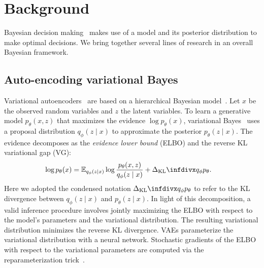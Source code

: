 \section{Background}
\label{sec:related}
Bayesian decision making~\cite{Fienberg} makes use of a model and its posterior distribution to make optimal decisions. We bring together several lines of research in an overall Bayesian framework.


\subsection{Auto-encoding variational Bayes}
\label{aevb}
Variational autoencoders~\cite{AEVB} are based on a hierarchical Bayesian model~\cite{GelmanHill:2007}. Let $x$ be the observed random variables and $z$ the latent variables. To learn a generative model $p_\theta(x, z)$ that maximizes the evidence $\log p_\theta(x)$, variational Bayes~\cite{wainwright2008graphical} uses a proposal distribution $q_\phi(z \mid x)$ to approximate the posterior $p_\theta(z \mid x)$. The evidence decomposes as the \emph{evidence lower bound} (ELBO) and the reverse KL variational gap (VG):
\begin{align}
    \log p_\theta(x) &= \mathbb{E}_{q_\phi(z \mid x)}\log \frac{p_\theta(x, z)}{q_\phi(z \mid x)} + \kl{q_\phi}{p_\theta}. \label{ELBO}
\end{align}
Here we adopted the condensed notation $\kl{q_\phi}{p_\theta}$ to refer to the KL divergence between $q_\phi(z\mid x)$ and $p_\theta(z \mid x)$.
In light of this decomposition, a valid inference procedure involves jointly maximizing the ELBO with respect to the model's parameters and the variational distribution. The resulting variational distribution minimizes the reverse KL divergence. VAEs parameterize the variational distribution with a neural network. Stochastic gradients of the ELBO with respect to the variational parameters are computed via the reparameterization trick~\cite{AEVB}. 


